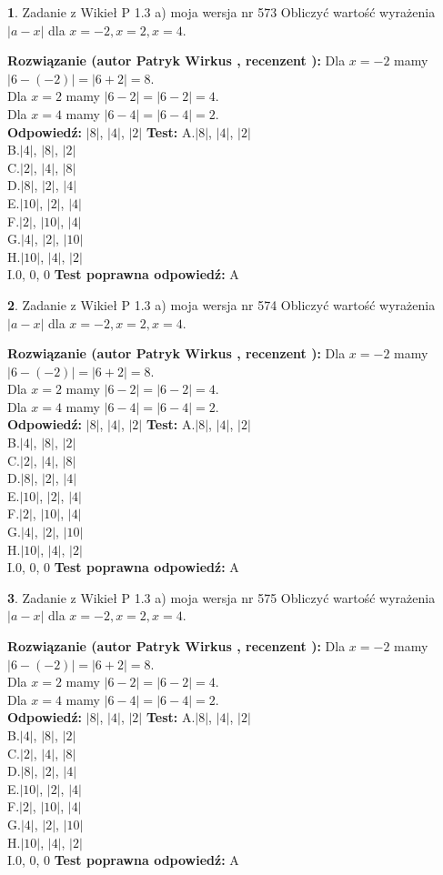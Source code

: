 \documentclass[12pt, a4paper]{article}
\theoremstyle{definition} %
\newtheorem{zad}{}
\newcommand{\zadStart}[1]{\begin{zad}#1\newline}
\newcommand{\zadStop}{\end{zad}}
\newcommand{\rozwStart}[2]{\noindent \textbf{Rozwiązanie (autor #1 , recenzent #2): }\newline}
\newcommand{\rozwStop}{\newline}
\newcommand{\odpStart}{\noindent \textbf{Odpowiedź:}\newline}
\newcommand{\odpStop}{\newline}
\newcommand{\testStart}{\noindent \textbf{Test:}\newline}
\newcommand{\testStop}{\newline}
\newcommand{\kluczStart}{\noindent \textbf{Test poprawna odpowiedź:}\newline}
\newcommand{\kluczStop}{\newline}
\begin{document}
\zadStart{Zadanie z Wikieł P 1.3 a) moja wersja nr 573}
Obliczyć wartość wyrażenia $|a - x|$ dla $x=-2,x=2,x=4$.
\zadStop
\rozwStart{Patryk Wirkus}{}
Dla $x = -2$ mamy $|6 - (-2)| = |6 + 2| = 8$.\\
Dla $x = 2$ mamy $|6 - 2| = |6 - 2| = 4$.\\
Dla $x = 4$ mamy $|6 - 4| = |6 - 4| = 2$.\\
\rozwStop
\odpStart
$|8|$, $|4|$, $|2|$
\odpStop
\testStart
A.$|8|$, $|4|$, $|2|$\\
B.$|4|$, $|8|$, $|2|$\\
C.$|2|$, $|4|$, $|8|$\\
D.$|8|$, $|2|$, $|4|$\\
E.$|10|$, $|2|$, $|4|$\\
F.$|2|$, $|10|$, $|4|$\\
G.$|4|$, $|2|$, $|10|$\\
H.$|10|$, $|4|$, $|2|$\\
I.$0$, $0$, $0$
\testStop
\kluczStart
A
\kluczStop



\zadStart{Zadanie z Wikieł P 1.3 a) moja wersja nr 574}
Obliczyć wartość wyrażenia $|a - x|$ dla $x=-2,x=2,x=4$.
\zadStop
\rozwStart{Patryk Wirkus}{}
Dla $x = -2$ mamy $|6 - (-2)| = |6 + 2| = 8$.\\
Dla $x = 2$ mamy $|6 - 2| = |6 - 2| = 4$.\\
Dla $x = 4$ mamy $|6 - 4| = |6 - 4| = 2$.\\
\rozwStop
\odpStart
$|8|$, $|4|$, $|2|$
\odpStop
\testStart
A.$|8|$, $|4|$, $|2|$\\
B.$|4|$, $|8|$, $|2|$\\
C.$|2|$, $|4|$, $|8|$\\
D.$|8|$, $|2|$, $|4|$\\
E.$|10|$, $|2|$, $|4|$\\
F.$|2|$, $|10|$, $|4|$\\
G.$|4|$, $|2|$, $|10|$\\
H.$|10|$, $|4|$, $|2|$\\
I.$0$, $0$, $0$
\testStop
\kluczStart
A
\kluczStop



\zadStart{Zadanie z Wikieł P 1.3 a) moja wersja nr 575}
Obliczyć wartość wyrażenia $|a - x|$ dla $x=-2,x=2,x=4$.
\zadStop
\rozwStart{Patryk Wirkus}{}
Dla $x = -2$ mamy $|6 - (-2)| = |6 + 2| = 8$.\\
Dla $x = 2$ mamy $|6 - 2| = |6 - 2| = 4$.\\
Dla $x = 4$ mamy $|6 - 4| = |6 - 4| = 2$.\\
\rozwStop
\odpStart
$|8|$, $|4|$, $|2|$
\odpStop
\testStart
A.$|8|$, $|4|$, $|2|$\\
B.$|4|$, $|8|$, $|2|$\\
C.$|2|$, $|4|$, $|8|$\\
D.$|8|$, $|2|$, $|4|$\\
E.$|10|$, $|2|$, $|4|$\\
F.$|2|$, $|10|$, $|4|$\\
G.$|4|$, $|2|$, $|10|$\\
H.$|10|$, $|4|$, $|2|$\\
I.$0$, $0$, $0$
\testStop
\kluczStart
A
\kluczStop
\end{document}
